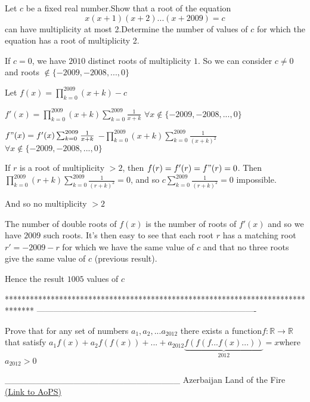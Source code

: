 \begin{solution}
	\begin{tcolorbox}Let $c$ be a fixed real number.Show that a root of the equation \[x(x+1)(x+2)...(x+2009)=c\] can have multiplicity at most 2.Determine the number of values of $c$ for which the equation has a root of multiplicity 2.\end{tcolorbox}
If $c=0$, we have $2010$ distinct roots of multiplicity $1$. So we can consider $c\ne 0$ and roots $\notin\{-2009,-2008,...,0\}$

Let $f(x)=\prod_{k=0}^{2009}(x+k)-c$

$f'(x)=\prod_{k=0}^{2009}(x+k)\sum_{k=0}^{2009}\frac 1{x+k}$ $\forall x\notin\{-2009,-2008,...,0\}$

$f"(x)=f'(x)\sum_{k=0}^{2009}\frac 1{x+k}$ $-\prod_{k=0}^{2009}(x+k)\sum_{k=0}^{2009}\frac 1{(x+k)^2}$ $\forall x\notin\{-2009,-2008,...,0\}$

If $r$ is a root of multiplicity $>2$, then $f(r)=f'(r)=f"(r)=0$. Then $\prod_{k=0}^{2009}(r+k)\sum_{k=0}^{2009}\frac 1{(r+k)^2}=0$, and so $c\sum_{k=0}^{2009}\frac 1{(r+k)^2}=0$ impossible.

And so no multiplicity $>2$

The number of double roots of $f(x)$ is the number of roots of $f'(x)$ and so we have $2009$ such roots.
It's then easy to see that each root $r$ has a matching root $r'=-2009-r$ for which we have the same value of $c$ and that no three roots give the same value of $c$ (previous result).

Hence the result $\boxed{1005}$ values of $c$
\end{solution}
*******************************************************************************
-------------------------------------------------------------------------------

\begin{problem}
	Prove that for any set of numbers $a_1,a_2,...a_{2012}$ there exists a function$f: \mathbb{R}\to\mathbb{R}$that satisfy
$a_1f(x)+a_2f(f(x))+...+a_{2012}\underbrace{f(f(f...f(x)...))}_{2012}=x$where$ a_{2012}>0$

____________________________
Azerbaijan Land of the Fire 
	\flushright \href{https://artofproblemsolving.com/community/c6h474030}{(Link to AoPS)}
\end{problem}



